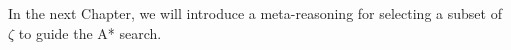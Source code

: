 %
%

In the next Chapter, we will introduce a meta-reasoning for selecting a subset of $\zeta$ to guide the A* search.